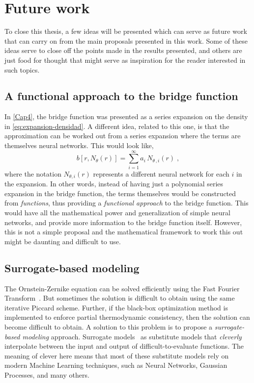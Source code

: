 \section{Future work}
To close this thesis, a few ideas will be presented which can serve as future work that can 
carry on from the main proposals presented in this work. Some of these ideas serve to close 
off the points made in the results presented, and others are just food for 
thought that might serve as inspiration for the reader interested in such topics.

\subsection{A functional approach to the bridge function}
In \autoref{Cap4}, the bridge function was presented as a series expansion on the density 
in \autoref{eq:expansion-densidad}. A different idea, related to this one, is that the 
approximation can be worked out from a series expansion where the terms are themselves 
neural networks. This would look like,
\begin{equation}
    b \left[r, N_{\theta}(r)\right] = \sum_{i=1}^{\infty} a_{i} \, N_{\theta \, , i} (r)
    \; ,
    \label{eq:functional-bridge}
\end{equation}
where the notation \(N_{\theta,i}(r)\) represents a different neural network for each 
\(i\) in the expansion. In other words, instead of having just a polynomial series 
expansion in the bridge function, the terms themselves would be constructed from 
\emph{functions}, thus providing a \emph{functional approach} to the bridge function. This 
would have all the mathematical power and generalization of simple neural networks, and 
provide more information to the bridge function itself. However, this is not a simple 
proposal and the mathematical framework to work this out might be daunting and difficult to 
use.

\subsection{Surrogate-based modeling}
The Ornstein-Zernike equation can be solved efficiently using the Fast Fourier 
Transform~\cite{hammingNumericalMethodsScientists2012}. But sometimes the solution is 
difficult to obtain using the same iterative Piccard scheme. Further, if the black-box 
optimization method is implemented to enforce partial thermodynamic consistency, then the 
solution can become difficult to obtain. A solution to this problem is to propose a 
\emph{surrogate-based modeling} approach. Surrogate 
models~\cite{forresterRecentAdvancesSurrogatebased2009} as substitute models that 
\emph{cleverly} interpolate between the input and output of difficult-to-evaluate 
functions. The meaning of clever here means that most of these substitute models rely on 
modern Machine Learning techniques, such as Neural Networks, Gaussian Processes, and many 
others.

